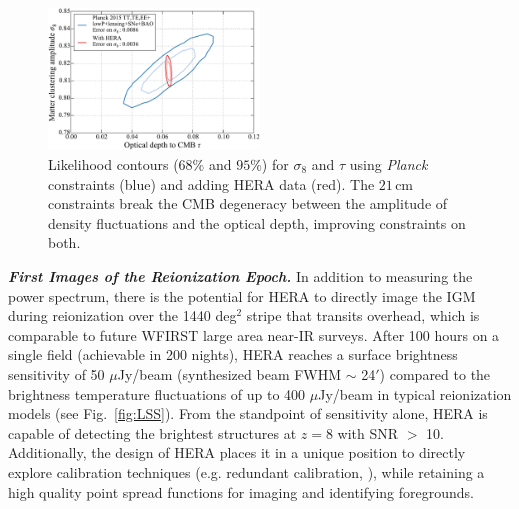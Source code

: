 \documentclass[preprint,11pt]{aastex}
\begin{document}
\begin{figure}[h!]
\centering
    \includegraphics[width=0.50\textwidth,clip]{plots/sigmaTau.pdf}
\caption{Likelihood contours ($68\%$ and $95\%$) for $\sigma_8$ and $\tau$ using \emph{Planck} constraints (blue) and 
adding HERA data (red). 
The $21\,\textrm{cm}$ constraints break the CMB degeneracy between the amplitude of density fluctuations and the optical depth, improving constraints on both.}
	\label{fig:sigma8Tau}
\end{figure} 


\emph{\textbf{First Images of the Reionization Epoch.}}
\label{sec:imaging}
In addition to measuring the power spectrum, there is the potential for HERA  
 to directly image the IGM during reionization
over the 1440 deg$^2$ stripe that transits overhead, which is comparable to future WFIRST
large area near-IR surveys.
 After 100 hours on a single field (achievable in 200 nights), HERA reaches a surface brightness 
sensitivity of 50 $\mu$Jy/beam (synthesized beam FWHM $\sim$ 24$'$) compared 
to the brightness temperature fluctuations of up to 400 $\mu$Jy/beam in typical 
reionization models (see Fig.~\ref{fig:LSS}). From the standpoint of sensitivity alone, HERA is capable of 
detecting the brightest structures at $z=8$ with SNR $>$ 10. Additionally, the design 
of HERA places it in a unique position to directly explore calibration techniques
(e.g. redundant calibration, \citealt{liu_et_al2010,zheng_et_al2014}), while retaining a high quality 
point spread functions for imaging and identifying foregrounds. 

\end{document}
